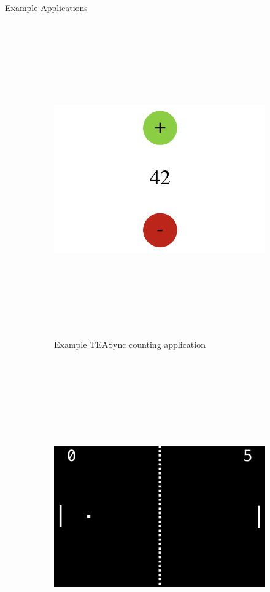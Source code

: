 \documentclass[22pt]{beamer}
\begin{document}
\begin{frame}[fragile]
\begin{textblock}{7.25}
\begin{block}{\fontsize{37}{20}\selectfont Example Applications}
            \begin{figure}
                \begin{subfigure}{0.49\textwidth}
                    \centering
                    \includegraphics[height = 13.5cm,trim={0 5mm 0 5mm},clip]{IncDec.png}
                    \caption{Example TEASync counting application}
                    \label{Fig:Counter}
                \end{subfigure}
                \begin{subfigure}{0.49\textwidth}
                    \centering
                    \includegraphics[height = 13.5cm]{Pong.png}

\end{subfigure}
\end{figure}
\end{block}
\end{textblock}
\end{frame}
\end{document}
